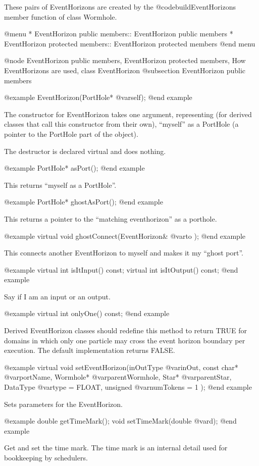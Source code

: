 These pairs of EventHorizons are created by the
@code{buildEventHorizons} member function of class Wormhole.

@menu
* EventHorizon public members::  EventHorizon public members
* EventHorizon protected members::  EventHorizon protected members
@end menu

@node EventHorizon public members, EventHorizon protected members, How EventHorizons are used, class EventHorizon
@subsection EventHorizon public members

@example
EventHorizon(PortHole* @var{self});
@end example

The constructor for EventHorizon takes one argument, representing (for
derived classes that call this constructor from their own), ``myself'' as
a PortHole (a pointer to the PortHole part of the object).

The destructor is declared virtual and does nothing.

@example
PortHole* asPort();
@end example

This returns ``myself as a PortHole''.

@example
PortHole* ghostAsPort();
@end example

This returns a pointer to the ``matching eventhorizon'' as a porthole.

@example
virtual void ghostConnect(EventHorizon& @var{to} );
@end example

This connects another EventHorizon to myself and makes it my ``ghost
port''.

@example
virtual int isItInput() const;
virtual int isItOutput() const;
@end example

Say if I am an input or an output.

@example
virtual int onlyOne() const;
@end example

Derived EventHorizon classes should redefine this method to return TRUE
for domains in which only one particle may cross the event horizon
boundary per execution.  The default implementation returns FALSE.

@example
virtual void setEventHorizon(inOutType @var{inOut}, const char* @var{portName},
     Wormhole* @var{parentWormhole}, Star* @var{parentStar},
     DataType @var{type} = FLOAT, unsigned @var{numTokens} = 1 );
@end example

Sets parameters for the EventHorizon.

@example
double getTimeMark();
void setTimeMark(double @var{d});
@end example

Get and set the time mark.  The time mark is an internal detail used for
bookkeeping by schedulers.

